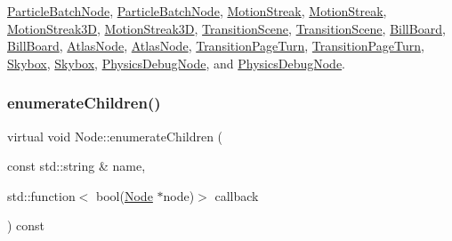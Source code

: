 \hyperlink{classParticleBatchNode_a780eb41e700d1c44f07dcca694431567}{Particle\+Batch\+Node}, \hyperlink{classParticleBatchNode_a05ece10bbbbb5566e28ba1365498eb91}{Particle\+Batch\+Node}, \hyperlink{classMotionStreak_a5cde4c7320bde796324d67ac11125a1f}{Motion\+Streak}, \hyperlink{classMotionStreak_aba3df66a00afb1a9c46178da191041df}{Motion\+Streak}, \hyperlink{classMotionStreak3D_a3b13ccd501ac16227a117870695f34f1}{Motion\+Streak3D}, \hyperlink{classMotionStreak3D_a108b68a6e6a37a5bc307761c1d14fdaa}{Motion\+Streak3D}, \hyperlink{classTransitionScene_ac66bc3e8b2853b3b7078eea2339c9245}{Transition\+Scene}, \hyperlink{classTransitionScene_ae3600e652909eeae3113bc39ce8ef8d1}{Transition\+Scene}, \hyperlink{classBillBoard_a61816c66a9b5dbfbe12cf1bd747f5229}{Bill\+Board}, \hyperlink{classBillBoard_ab8ccc9dc2cbbf46f1f2a56cd0283ce94}{Bill\+Board}, \hyperlink{classAtlasNode_af4fb010941d0fd8d26c14a5c524a6b55}{Atlas\+Node}, \hyperlink{classAtlasNode_aa396ca085059861b67e3ad9471de797c}{Atlas\+Node}, \hyperlink{classTransitionPageTurn_a2df5e0dc13a58e5ac7c8ce27703bd384}{Transition\+Page\+Turn}, \hyperlink{classTransitionPageTurn_a1e00260a163de7b41a5827ee9ed34d61}{Transition\+Page\+Turn}, \hyperlink{classSkybox_a6276d85580a2b725dd5dac0c4837c640}{Skybox}, \hyperlink{classSkybox_a08385a028880991afa6550e25720c37e}{Skybox}, \hyperlink{classPhysicsDebugNode_a71bda24e446762fc1a1ae2d31927d19a}{Physics\+Debug\+Node}, and \hyperlink{classPhysicsDebugNode_a78fe785679cead2a155f0f767932a89f}{Physics\+Debug\+Node}.

\mbox{\label{classNode_ada6f69bdf4cd0b241dc12935536f3dbe}} 
\subsubsection{\texorpdfstring{enumerate\+Children()}{enumerateChildren()}\hspace{0.1cm}{\footnotesize\ttfamily [1/2]}}
{\footnotesize\ttfamily virtual void Node\+::enumerate\+Children (\begin{DoxyParamCaption}\item[{const std\+::string \&}]{name,  }\item[{std\+::function$<$ bool(\hyperlink{classNode}{Node} $\ast$node)$>$}]{callback }\end{DoxyParamCaption}) const\hspace{0.3cm}{\ttfamily [virtual]}}

